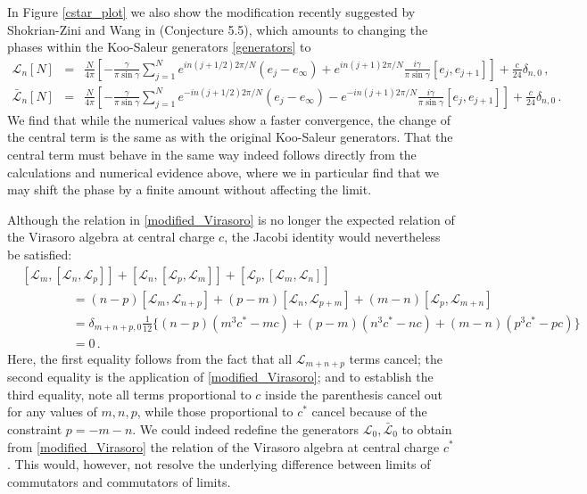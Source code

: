 \documentclass[a4paper,10pt]{article}
\newcommand{\linnea}[1]{$\framebox{\tiny L}$\ \textbf{\texttt{{\color{red}\footnotesize#1}}}}
\newcommand{\KSgen}{\mathcal{L}}
\begin{document}
In Figure \ref{cstar_plot} we also show the modification recently suggested by Shokrian-Zini and Wang in \cite{Wang} (Conjecture 5.5), which amounts to changing the phases within the Koo-Saleur generators \eqref{generators} to
\begin{subequations}
\label{ZW_generators}
\begin{eqnarray}
%
\KSgen_n[N] \!\!\! &=& \!\!\! \frac{N}{4\pi} \left[ -\frac{\gamma}{\pi \sin \gamma}  \sum^{N}_{j=1} e^{in(j+1/2)2\pi/N} \left( e_j - e_\infty \right) + e^{in(j+1)2\pi/N} \frac{i\gamma}{\pi \sin \gamma} [e_j, e_{j+1} ] \right] + \frac{c}{24} \delta_{n,0} \,, \\
%
\bar{\KSgen}_n[N] \!\!\! &=& \!\!\! \frac{N}{4\pi} \left[ -\frac{\gamma}{\pi \sin \gamma}  \sum^{N}_{j=1} e^{-in(j+1/2)2\pi/N} \left( e_j-  e_\infty \right) - e^{-in(j+1)2\pi/N} \frac{i\gamma}{\pi \sin \gamma} [e_j, e_{j+1} ] \right] + \frac{c}{24} \delta_{n,0} \,.
%
\end{eqnarray}
\end{subequations}
%
We find that while the numerical values show a faster convergence, the change of the central term is the same as with the original Koo-Saleur generators. That the central term must behave in the same way indeed follows directly from the calculations and numerical evidence above, where we in particular find that we may shift the phase by a finite amount without affecting the limit.


%
Although the relation in \eqref{modified_Virasoro} is no longer the expected relation of the Virasoro algebra at central charge $c$, the Jacobi identity would nevertheless be satisfied:
\begin{align}
& [{\mathcal L}_m,[{\mathcal L}_n,{\mathcal L}_p]] + [{\mathcal L}_n,[{\mathcal L}_p,{\mathcal L}_m]] + [{\mathcal L}_p,[{\mathcal L}_m,{\mathcal L}_n]] \nonumber \\
& \qquad \qquad =(n-p)[{\mathcal L}_m,{\mathcal L}_{n+p}] + (p-m)[{\mathcal L}_n,{\mathcal L}_{p+m}] + (m-n)[{\mathcal L}_p,{\mathcal L}_{m+n}] \nonumber \\
& \qquad \qquad =\delta_{m+n+p,0} \frac{1}{12} \Big\{
 (n-p) (m^3 c^* - mc)
 +(p-m) (n^3 c^* - nc)
 +(m-n) (p^3c^* -pc)
 \Big\} \nonumber \\
 & \qquad \qquad = 0 \,.
\end{align}
Here, the first equality follows from the fact that all ${\mathcal L_{m+n+p}}$ terms cancel; the second equality is the application of \eqref{modified_Virasoro}; and to establish the third equality, note all terms proportional to $c$ inside the parenthesis cancel out for any values of $m,n,p$, while those proportional to $c^*$ cancel because of the constraint $p=-m-n$. We could indeed redefine the generators $\KSgen_0,\bar{\KSgen}_0$ to obtain from \eqref{modified_Virasoro}  the relation of the Virasoro algebra at central charge $c^*$. This would, however, not resolve the underlying difference between limits of commutators and commutators of limits.%
\end{document}
